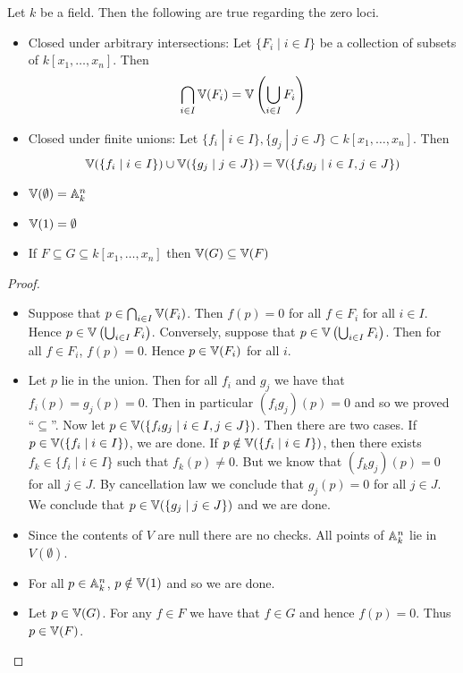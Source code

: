 \documentclass[a4paper]{article}
\begin{document}
\begin{prp}{}{} Let $k$ be a field. Then the following are true regarding the zero loci. 
\begin{itemize}
\item Closed under arbitrary intersections: Let $\{F_i\;|\;i\in I\}$ be a collection of subsets of $k[x_1,\dots,x_n]$. Then $$\bigcap_{i\in I}\mathbb{V}(F_i)=\mathbb{V}\left(\bigcup_{i\in I}F_i\right)$$
\item Closed under finite unions: Let $\{f_i\;|\;i\in I\},\{g_j\;|\;j\in J\}\subset k[x_1,\dots,x_n]$. Then $$\mathbb{V}(\{f_i\;|\;i\in I\})\cup\mathbb{V}(\{g_j\;|\;j\in J\})=\mathbb{V}(\{f_ig_j\;|\;i\in I, j\in J\})$$
\item $\mathbb{V}(\emptyset)=\mathbb{A}_k^n$
\item $\mathbb{V}(1)=\emptyset$
\item If $F\subseteq G\subseteq k[x_1,\dots,x_n]$ then $\mathbb{V}(G)\subseteq\mathbb{V}(F)$
\end{itemize}\tcbline
\begin{proof}~\\
\begin{itemize}
\item Suppose that $p\in\bigcap_{i\in I}\mathbb{V}(F_i)$. Then $f(p)=0$ for all $f\in F_i$ for all $i\in I$. Hence $p\in\mathbb{V}\left(\bigcup_{i\in I}F_i\right)$. Conversely, suppose that $p\in\mathbb{V}\left(\bigcup_{i\in I}F_i\right)$. Then for all $f\in F_i$, $f(p)=0$. Hence $p\in\mathbb{V}(F_i)$ for all $i$. 
\item Let $p$ lie in the union. Then for all $f_i$ and $g_j$ we have that $f_i(p)=g_j(p)=0$. Then in particular $(f_ig_j)(p)=0$ and so we proved ``$\subseteq$''. Now let $p\in\mathbb{V}(\{f_ig_j\;|\;i\in I, j\in J\})$. Then there are two cases. If $p\in\mathbb{V}(\{f_i\;|\;i\in I\})$, we are done. If $p\notin\mathbb{V}(\{f_i\;|\;i\in I\})$, then there exists $f_k\in\{f_i\;|\;i\in I\}$ such that $f_k(p)\neq 0$. But we know that $(f_kg_j)(p)=0$ for all $j\in J$. By cancellation law we conclude that $g_j(p)=0$ for all $j\in J$. We conclude that $p\in\mathbb{V}(\{g_j\;|\;j\in J\})$ and we are done. 
\item Since the contents of $V$ are null there are no checks. All points of $\mathbb{A}_k^n$ lie in $V(\emptyset)$. 
\item For all $p\in\mathbb{A}_k^n$, $p\notin\mathbb{V}(1)$ and so we are done. 
\item Let $p\in\mathbb{V}(G)$. For any $f\in F$ we have that $f\in G$ and hence $f(p)=0$. Thus $p\in\mathbb{V}(F)$. 
\end{itemize}
\end{proof}
\end{prp}
\end{document}
